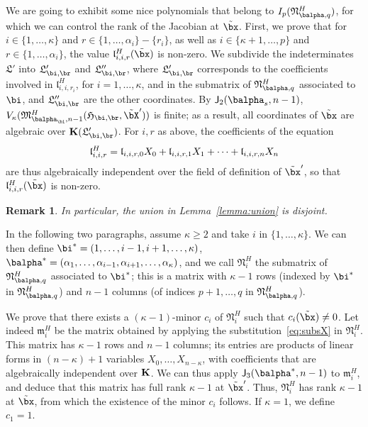 \documentclass[12pt]{article}
\newtheorem{remark}[definition]{Remark}
\begin{document}
We are going to exhibit some nice polynomials that belong to
$I_p(\mathfrak{N}^H_{\balpha,q})$, for which we can control the rank
of the Jacobian at $\tilde\bx$. First, we prove that for
$i\in\{1,\dots,\kappa\}$ and $r \in \{1,\dots,\alpha_i\}-\{r_i\}$, as
well as $i\in\{\kappa+1,\dots,p\}$ and $r \in \{1,\dots,\alpha_i\}$,
the value $\mathfrak{l}^H_{i,i,r}(\tilde\bx)$ is non-zero.  We
subdivide the indeterminates $\mathfrak{L}'$ into $\mathfrak{L}'_{\bi,\br}$ and
$\mathfrak{L}''_{\bi,\br}$, where $\mathfrak{L}'_{\bi,\br}$ corresponds to the
coefficients involved in $\mathfrak{l}^H_{i,i,r_i}$, for $i=1,\dots,\kappa$,
and in the submatrix of $\mathfrak{N}^H_{\balpha,q}$ associated to $\bi$,
and $\mathfrak{L}''_{\bi,\br}$ are the other coordinates.  By
$\assI_2(\balpha_s,n-1)$,
$V_\kappa(\mathfrak{M}^H_{\balpha_\bi,n-1}(\mathfrak{H}_{\bi,\br},\tilde\bX'))$ is finite; as
a result, all coordinates of $\tilde\bx$ are algebraic over
$\KK(\mathfrak{L}'_{\bi,\br})$. For $i,r$ as above, the coefficients
of the equation
$$\mathfrak{l}^H_{i,i,r} = \frak{l}_{i,i,r,0} X_0+ \frak{l}_{i,i,r,1}
X_1 +\cdots + \frak{l}_{i,i,r,n} X_n$$ are thus algebraically independent
over the field of definition of $\tilde\bx'$, so that $\mathfrak{l}^H_{i,i,r}(\tilde\bx)$
is non-zero.

\begin{remark}\label{remark:disjoint}
  In particular, the union in Lemma~\ref{lemma:union} is disjoint.
\end{remark}

In the following two paragraphs, assume $\kappa \ge 2$
and take $i$ in $\{1,\dots,\kappa\}$. We can then define
$\bi^*=(1,\dots,i-1,i+1,\dots,\kappa)$,
$\balpha^*=(\alpha_1,\dots,\alpha_{i-1},\alpha_{i+1},\dots,\alpha_\kappa)$,
and we call $\mathfrak{N}^H_i$ the submatrix of
$\mathfrak{N}^H_{\balpha,q}$ associated to $\bi^*$; this is a matrix
with $\kappa-1$ rows (indexed by $\bi^*$ in
$\mathfrak{N}^H_{\balpha,q}$) and $n-1$ columns (of indices $p+1,\dots,q$ 
in $\mathfrak{N}^H_{\balpha,q}$).

We prove that there exists a $(\kappa-1)$-minor $c_i$ of
$\mathfrak{N}^H_i$ such that $c_i(\tilde\bx)\ne 0$.  Let indeed
$\mathfrak{m}^H_i$ be the matrix obtained by applying the
substitution~\eqref{eq:subsX} in $\mathfrak{N}^H_i$. This matrix 
has $\kappa-1$ rows and $n-1$ columns; its entries are products of
linear forms in $(n-\kappa)+1$ variables $X_0,\dots,X_{n-\kappa}$,
with coefficients that are algebraically
independent over $\mathbf{K}$. We can thus apply $\assI_3(\balpha^*,n-1)$ to
$\mathfrak{m}_{i}^H$, and deduce that this matrix has full rank $\kappa-1$
at $\tilde\bx'$.  Thus, $\mathfrak{N}^H_i$ has rank $\kappa-1$ at
$\tilde\bx$, from which the existence of the minor $c_i$ follows.
If $\kappa=1$, we define $c_1=1$.
\end{document}
